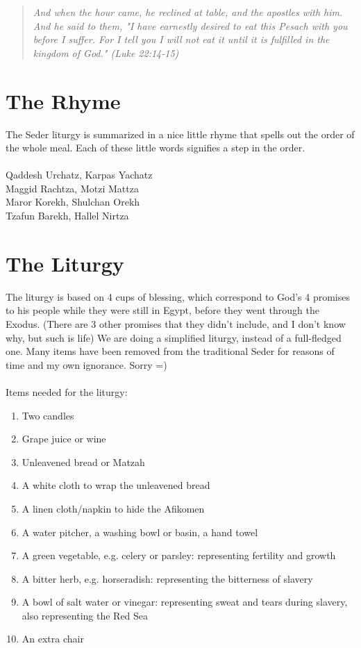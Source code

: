 \documentclass[10pt,oneside,footinclude=true,headinclude=true]{scrbook} %
\newcommand\quot[1]{
	\begin{quote}\textit{\small#1}\end{quote}
}
\begin{document}
\quot{And when the hour came, he reclined at table, and the apostles with him. And he said to them, "I have earnestly desired to eat this Pesach with you before I suffer. For I tell you I will not eat it until it is fulfilled in the kingdom of God." (Luke 22:14-15)}


\section{The Rhyme}

The Seder liturgy is summarized in a nice little rhyme that spells out the order of the whole meal. Each of these little words signifies a step in the order.\\
\\
Qaddesh Urchatz, Karpas Yachatz\\
Maggid Rachtza, Motzi Mattza\\
Maror Korekh, Shulchan Orekh\\
Tzafun Barekh, Hallel Nirtza


\section{The Liturgy}

The liturgy is based on 4 cups of blessing, which correspond to God's 4 promises to his people while they were still in Egypt, before they went through the Exodus. (There are 3 other promises that they didn't include, and I don't know why, but such is life) We are doing a simplified liturgy, instead of a full-fledged one. Many items have been removed from the traditional Seder for reasons of time and my own ignorance. Sorry =)\\
\\
Items needed for the liturgy:
\begin{enumerate}
	\item{Two candles}
	\item{Grape juice or wine}
	\item{Unleavened bread or Matzah}
	\item{A white cloth to wrap the unleavened bread}
	\item{A linen cloth/napkin to hide the Afikomen}
	\item{A water pitcher, a washing bowl or basin, a hand towel}
	\item{A green vegetable, e.g. celery or parsley: representing fertility and growth}
	\item{A bitter herb, e.g. horseradish: representing the bitterness of slavery}
	\item{A bowl of salt water or vinegar: representing sweat and tears during slavery, also representing the Red Sea}
	\item{An extra chair}
\end{enumerate}
\end{document}
